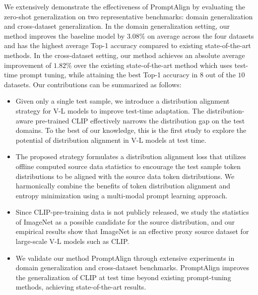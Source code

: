 \documentclass[a4paper]{article}
\begin{document}
We extensively demonstrate the effectiveness of PromptAlign by evaluating the zero-shot generalization on two representative benchmarks: domain generalization and cross-dataset generalization. In the domain generalization setting, our method improves the baseline model by $3.08\%$ on average across the four datasets and has the highest average Top-1 accuracy compared to existing state-of-the-art methods. In the cross-dataset setting, our method achieves an absolute average improvement of $1.82\%$ over the existing state-of-the-art method which uses test-time prompt tuning, while attaining the best Top-1 accuracy in $8$ out of the $10$ datasets. Our contributions can be summarized as follows:
\begin{itemize}
    \item Given only a single test sample, we introduce a distribution alignment strategy for V-L models to improve test-time adaptation. The distribution-aware pre-trained CLIP effectively narrows the distribution gap on the test domains. To the best of our knowledge, this is the first study to explore the potential of distribution alignment in V-L models at test time.
    \item The proposed strategy formulates a distribution alignment loss that utilizes offline computed source data statistics to encourage the test sample token distributions to be aligned with the source data token distributions. 
    We harmonically combine the benefits of token distribution alignment and entropy minimization using a multi-modal prompt learning approach.
    \item Since CLIP-pre-training data is not publicly released, we study the statistics of ImageNet as a possible candidate for the source distribution, and our empirical results show that ImageNet is an effective proxy source dataset for large-scale V-L models such as CLIP.
    \item We validate our method PromptAlign through extensive experiments in domain generalization and cross-dataset benchmarks. PromptAlign improves the generalization of CLIP at test time beyond existing prompt-tuning methods, achieving state-of-the-art results.
\end{itemize}



\end{document}
